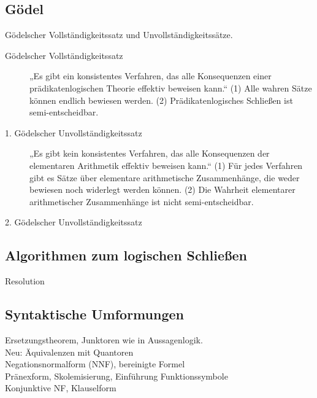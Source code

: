 \subsection{Gödel}
    Gödelscher Vollständigkeitssatz und Unvollständigkeitssätze. 
    \begin{description}
        \item[Gödelscher Vollständigkeitssatz] „Es gibt ein konsistentes Verfahren, das alle Konsequenzen einer prädikatenlogischen Theorie effektiv beweisen kann.“ (1) Alle wahren Sätze können endlich bewiesen werden. (2) Prädikatenlogisches Schließen ist semi-entscheidbar.
        \item[1. Gödelscher Unvollständigkeitssatz] „Es gibt kein konsistentes Verfahren, das alle Konsequenzen der elementaren Arithmetik effektiv beweisen kann.“ (1) Für jedes Verfahren gibt es Sätze über elementare arithmetische Zusammenhänge, die weder bewiesen noch widerlegt werden können. (2) Die Wahrheit elementarer arithmetischer Zusammenhänge ist nicht semi-entscheidbar.
        \item[2. Gödelscher Unvollständigkeitssatz]
    \end{description}

\subsection{Algorithmen zum logischen Schließen}
    Resolution 

\subsection{Syntaktische Umformungen}
    Ersetzungstheorem, Junktoren wie in Aussagenlogik. \\
    Neu: Äquivalenzen mit Quantoren  \\
    Negationsnormalform (NNF), bereinigte Formel  \\
    Pränexform, Skolemisierung, Einführung Funktionssymbole  \\
    Konjunktive NF, Klauselform 
